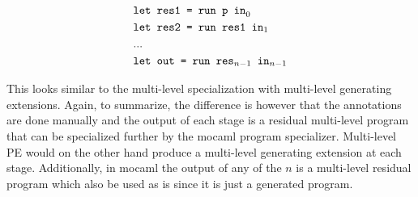\begin{align*}
&\text{\texttt{let res1 = run p in}}_0\\
&\text{\texttt{let res2 = run res1 in}}_1\\
&...\\
&\text{\texttt{let out = run res$_{n-1}$ in$_{n-1}$}}
\end{align*}

This looks similar to the multi-level specialization with multi-level generating extensions. Again, to summarize, the difference is however that the annotations are done manually and the output of each stage is a residual multi-level program that can be specialized further by the mocaml program specializer. Multi-level PE would on the other hand produce a multi-level generating extension at each stage. Additionally, in mocaml the output of any of the $n$ is a multi-level residual program which also be used as is since it is just a generated program.

